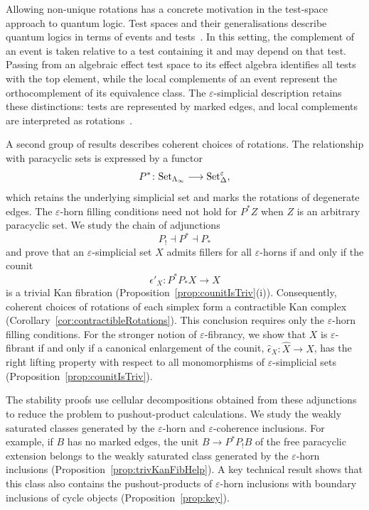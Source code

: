\documentclass{article}
\theoremstyle{plain}
\theoremstyle{definition}
\theoremstyle{remark}
\begin{document}
Allowing non-unique rotations has a concrete motivation in the
test-space approach to quantum logic. Test spaces and their
generalisations describe quantum logics in terms of events and
tests~\cite{FPR,Gudder1997EffectTestSpacesAndAlgebras}.
In this setting, the complement of an event is taken relative to
a test containing it and may depend on that test.
Passing from an algebraic effect test space to its effect algebra
identifies all tests with the top element, while the local complements
of an event represent the orthocomplement of its equivalence class.
The $\varepsilon$-simplicial description retains these distinctions:
tests are represented by marked edges, and local complements are
interpreted as rotations~\cite{Lachman2026}.

A second group of results describes coherent choices of rotations.
The relationship with paracyclic sets is expressed by a functor
\[
    P^*\colon
    \mathrm{Set}_{\Lambda_\infty}
    \longrightarrow\mathrm{Set}^\varepsilon_\Delta,
\]
which retains the underlying simplicial set and marks the rotations
of degenerate edges. The $\varepsilon$-horn filling conditions need
not hold for $P^*Z$ when $Z$ is an arbitrary paracyclic set.
We study the chain of adjunctions
\[
    P_!\dashv P^*\dashv P_*
\]
and prove that an $\varepsilon$-simplicial set $X$ admits fillers for
all $\varepsilon$-horns if and only if the counit
\[
    \epsilon'_X\colon P^*P_*X\longrightarrow X
\]
is a trivial Kan fibration (Proposition~\ref{prop:counitIsTriv}(i)).
Consequently, coherent choices of rotations of each simplex form
a contractible Kan complex (Corollary~\ref{cor:contractibleRotations}).
This conclusion requires only the $\varepsilon$-horn filling conditions.
For the stronger notion of $\varepsilon$-fibrancy, we show that $X$
is $\varepsilon$-fibrant if and only if a canonical enlargement of
the counit, $\widehat\epsilon_X\colon\widehat X\to X$, has the right
lifting property with respect to all monomorphisms of
$\varepsilon$-simplicial sets (Proposition~\ref{prop:counitIsTriv}).

The stability proofs use cellular decompositions obtained from these
adjunctions to reduce the problem to pushout-product calculations.
We study the weakly saturated classes generated by the
$\varepsilon$-horn and $\varepsilon$-coherence inclusions.
For example, if $B$ has no marked edges, the unit
$B\to P^*P_!B$ of the free paracyclic extension belongs to the
weakly saturated class generated by the $\varepsilon$-horn inclusions
(Proposition~\ref{prop:trivKanFibHelp}).
A key technical result shows that this class also contains the
pushout-products of $\varepsilon$-horn inclusions with boundary
inclusions of cycle objects (Proposition~\ref{prop:key}).
\end{document}
